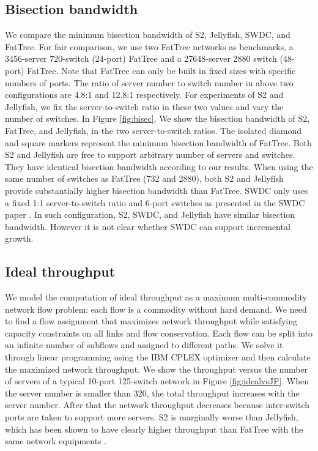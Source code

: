 \documentclass[10pt,conference]{IEEEtran}
\begin{document}
\subsection{Bisection bandwidth}
We compare the minimum bisection bandwidth of S2, Jellyfish, SWDC, and FatTree.
For fair comparison, we use two FatTree networks as benchmarks, a 3456-server 720-switch (24-port) FatTree and a 27648-server 2880 switch (48-port) FatTree.
Note that FatTree can only be built in fixed sizes with specific numbers of ports. The ratio of server number to switch number in above two configurations are 4.8:1 and 12.8:1 respectively.
For experiments of S2 and Jellyfish, we fix the server-to-switch ratio in these two values and vary the number of switches.
In Figure \ref{fig:bisec},
We show the bisection bandwidth of S2, FatTree, and Jellyfish, in the two server-to-switch ratios.
The isolated diamond and square markers represent the minimum bisection bandwidth of FatTree.
Both S2 and Jellyfish are free to support arbitrary number of servers and switches. They have identical bisection bandwidth according to our results.
When using the same number of switches as FatTree (732 and 2880), both S2 and Jellyfish provide substantially higher bisection bandwidth than FatTree.
SWDC only uses a fixed 1:1 server-to-switch ratio and 6-port switches as presented in the SWDC paper \cite{SWDC}.
In such configuration,  S2, SWDC, and Jellyfish have similar bisection bandwidth. However it is not clear whether SWDC can support incremental growth.

\subsection{Ideal throughput}
We model the computation of ideal throughput as a maximum multi-commodity network flow problem: each flow is a commodity without hard demand. We need to find a flow assignment that maximizes network throughput while satisfying capacity constraints on all links and flow conservation. Each flow can be split into an infinite number of subflows and assigned to different paths. We solve it through linear programming using the IBM CPLEX optimizer \cite{CPLEX} and then calculate the maximized network throughput. We show the throughput versus the number of servers of a typical 10-port 125-switch network in Figure \ref{fig:idealvsJF}. When the server number is smaller than 320, the total throughput increases with the server number. After that the network throughput decreases because inter-switch ports are taken to support more servers. S2 is marginally worse than Jellyfish, which has been shown to have clearly higher throughput than FatTree with the same network equipments \cite{Jellyfish}.
\end{document}

